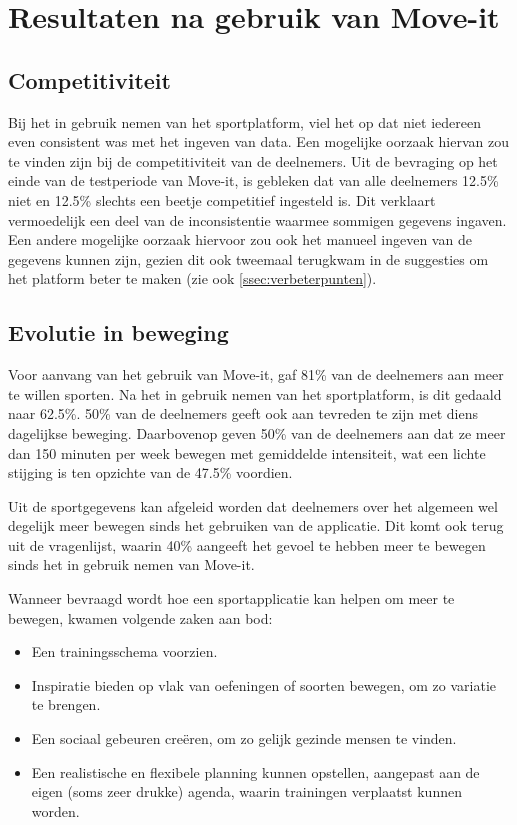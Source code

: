 \section{Resultaten na gebruik van Move-it}

\subsection{Competitiviteit}

Bij het in gebruik nemen van het sportplatform, viel het op dat niet iedereen even consistent was met het ingeven van data. Een mogelijke oorzaak hiervan zou te vinden zijn bij de competitiviteit van de deelnemers. Uit de bevraging op het einde van de testperiode van Move-it, is gebleken dat van alle deelnemers 12.5\% niet en 12.5\% slechts een beetje competitief ingesteld is. Dit verklaart vermoedelijk een deel van de inconsistentie waarmee sommigen gegevens ingaven.
Een andere mogelijke oorzaak hiervoor zou ook het manueel ingeven van de gegevens kunnen zijn, gezien dit ook tweemaal terugkwam in de suggesties om het platform beter te maken (zie ook \ref{ssec:verbeterpunten}).

\subsection{Evolutie in beweging}


Voor aanvang van het gebruik van Move-it, gaf 81\% van de deelnemers aan meer te willen sporten. Na het in gebruik nemen van het sportplatform, is dit gedaald naar 62.5\%. 50\% van de deelnemers geeft ook aan tevreden te zijn met diens dagelijkse beweging. Daarbovenop geven 50\% van de deelnemers aan dat ze meer dan 150 minuten per week bewegen met gemiddelde intensiteit, wat een lichte stijging is ten opzichte van de 47.5\% voordien.

Uit de sportgegevens kan afgeleid worden dat deelnemers over het algemeen wel degelijk meer bewegen sinds het gebruiken van de applicatie. Dit komt ook terug uit de vragenlijst, waarin 40\% aangeeft het gevoel te hebben meer te bewegen sinds het in gebruik nemen van Move-it.

Wanneer bevraagd wordt hoe een sportapplicatie kan helpen om meer te bewegen, kwamen volgende zaken aan bod:

\begin{itemize}
    \item Een trainingsschema voorzien.
    \item Inspiratie bieden op vlak van oefeningen of soorten bewegen, om zo variatie te brengen.
    \item Een sociaal gebeuren creëren, om zo gelijk gezinde mensen te vinden.
    \item Een realistische en flexibele planning kunnen opstellen, aangepast aan de eigen (soms zeer drukke) agenda, waarin trainingen verplaatst kunnen worden.
\end{itemize}


